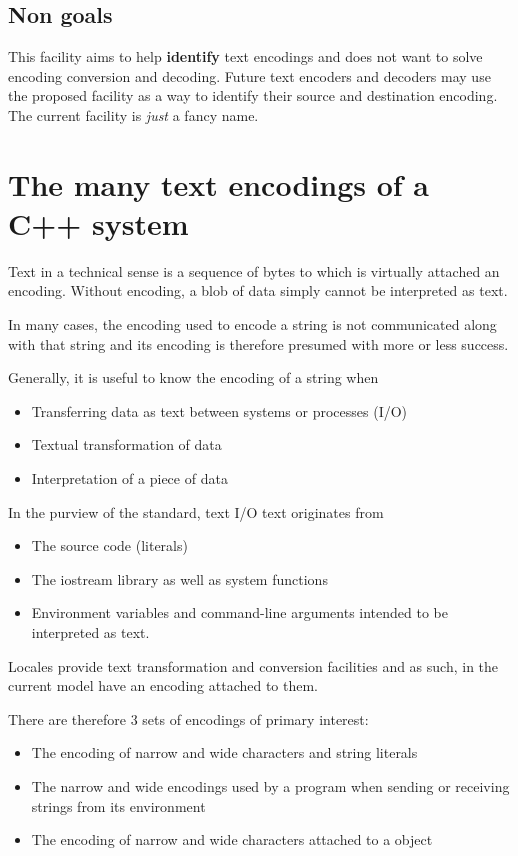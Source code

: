 \documentclass{wg21}
\begin{document}
\subsection{Non goals}

This facility aims to help \textbf{identify} text encodings and does not want to solve encoding conversion and decoding.
Future text encoders and decoders may use the proposed facility as a way to identify their source and destination encoding.
The current facility is \emph{just} a fancy name.

\section{The many text encodings of a C++ system}

Text in a technical sense is a sequence of bytes to which is virtually attached an encoding.
Without encoding, a blob of data simply cannot be interpreted as text.

In many cases, the encoding used to encode a string is not communicated along with that string and its
encoding is therefore presumed with more or less success.

Generally, it is useful to know the encoding of a string when

\begin{itemize}
    \item Transferring data as text between systems or processes (I/O)
    \item Textual transformation of data
    \item Interpretation of a piece of data
\end{itemize}

In the purview of the standard, text I/O text originates from
\begin{itemize}
    \item The source code (literals)
    \item The iostream library as well as system functions
    \item Environment variables and command-line arguments intended to be interpreted as text.
\end{itemize}

Locales provide text transformation and conversion facilities and as such, in the current model have an encoding attached to them.

There are therefore 3 sets of encodings of primary interest:

\begin{itemize}
    \item The encoding of narrow and wide characters and string literals
    \item The narrow and wide encodings used by a program when sending or receiving strings from its environment
    \item The encoding of narrow and wide characters attached to a  object
\end{itemize}
\end{document}
